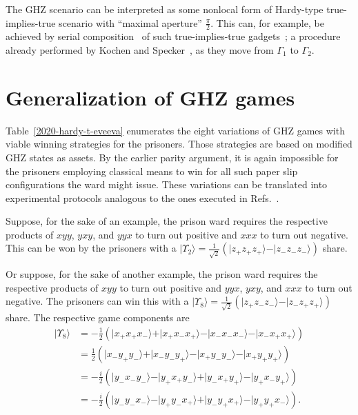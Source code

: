 \documentclass[sn-mathphys]{sn-jnl}%
\theoremstyle{thmstyleone}%
\theoremstyle{thmstyletwo}%
\theoremstyle{thmstylethree}%
\begin{document}
The GHZ scenario can be interpreted as some nonlocal form of Hardy-type
true-implies-true scenario with ``maximal aperture'' $\frac{\pi}{2}$.
This can, for example, be achieved by
serial composition~\cite{svozil-2018-whycontexts} of such true-implies-true gadgets~\cite{2018-minimalYIYS};
a procedure already performed by Kochen and Specker~\cite{kochen1,specker-ges}, as they move from $\Gamma_1$ to $\Gamma_2$.




\section{Generalization of GHZ games}

Table~\ref{2020-hardy-t-eveeva} enumerates the eight variations of GHZ games
with viable winning strategies for the prisoners.
Those strategies are based on modified GHZ states as assets.
By the earlier parity argument, it is again impossible for the prisoners employing classical means
to win for all such paper slip configurations the ward might issue.
These variations can be translated into experimental protocols analogous to the ones executed in Refs.~\cite{PhysRevLett.82.1345,panbdwz}.

Suppose, for the sake of an example, the prison ward requires the respective products of
$xyy$, $yxy$, and $yyx$  to turn out positive and $xxx$ to turn out negative.
This can be won by the prisoners with a $\vert \Upsilon_2 \rangle = \frac{1}{\sqrt{2}}\left( \vert z_+z_+z_+ \rangle  - \vert z_-z_-z_- \rangle \right) $ share.

Or suppose, for the sake of another example, the prison ward requires the respective products of
$xyy$  to turn out positive and $yyx$, $yxy$, and $xxx$ to turn out negative.
The prisoners can win this with a $\vert \Upsilon_8 \rangle = \frac{1}{\sqrt{2}}\left( \vert z_+z_-z_- \rangle  - \vert z_-z_+z_+ \rangle \right) $ share.
The respective game components are
\begin{equation}
\begin{aligned}
\vert \Upsilon_8 \rangle
&=  -\frac{1}{2}
\left(
\vert x_+x_+x_- \rangle +
\vert x_+x_-x_+ \rangle -
\vert x_-x_-x_- \rangle -
\vert x_-x_+x_+ \rangle
\right)  \\
&=  \frac{1}{2}
\left(
\vert x_-y_+y_- \rangle +
\vert x_-y_-y_+ \rangle -
\vert x_+y_-y_- \rangle -
\vert x_+y_+y_+ \rangle
\right)  \\
&=  -\frac{i}{2}
\left(
\vert y_-x_-y_- \rangle -
\vert y_+x_+y_- \rangle +
\vert y_-x_+y_+ \rangle -
\vert y_+x_-y_+ \rangle
\right)  \\
&=  -\frac{i}{2}
\left(
\vert y_-y_-x_- \rangle -
\vert y_+y_-x_+ \rangle +
\vert y_-y_+x_+ \rangle -
\vert y_+y_+x_- \rangle
\right)
.
\end{aligned}
\label{2020-ex-rew-ghz8}
\end{equation}
\end{document}

